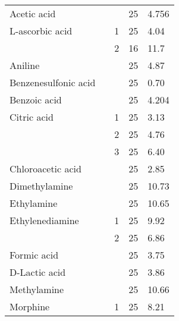 \documentclass[a4paper, 10pt]{article}
\begin{document}
\begin{footnotesize}
    \begin{supertabular}{llc@{\hspace{2.0mm}}c@{\hspace{2.0mm}}l}
        Acetic acid          &        &      & 25              & \num{4,756} \\
        L-ascorbic acid      &         & 1    & 25              & \num{4,04} \\
                             &                    & 2    & 16              & \num{11,7} \\
        Aniline              &        &      & 25              & \num{4,87} \\
        Benzenesulfonic acid &       &      & 25              & \num{0,70} \\
        Benzoic acid         &       &      & 25              & \num{4,204} \\
        Citric acid          &       & 1    & 25              & \num{3,13} \\
                             &                    & 2    & 25              & \num{4,76} \\
                             &                    & 3    & 25              & \num{6,40} \\
        Chloroacetic acid    &      &      & 25              & \num{2,85} \\
        Dimethylamine        &       &      & 25              & \num{10,73} \\
        Ethylamine           &        &      & 25              & \num{10,65} \\
        Ethylenediamine      &   & 1    & 25              & \num{9,92} \\
                             &                    & 2    & 25              & \num{6,86} \\
        Formic acid          &          &      & 25              & \num{3,75} \\
        D-Lactic acid        &  &      & 25              & \num{3,86} \\
        Methylamine          &         &      & 25              & \num{10,66} \\
        Morphine             &      & 1    & 25              & \num{8,21} \\

\end{supertabular}
\end{footnotesize}
\end{document}

